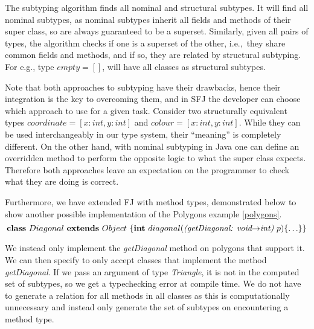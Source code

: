 \documentclass[runningheads]{llncs}
\begin{document}
The subtyping algorithm finds all nominal and structural subtypes.
It will find all nominal subtypes, as nominal subtypes inherit all fields and methods of their super class, so are always guaranteed to be a superset. 
Similarly, given all pairs of types, the algorithm checks if one is a superset of the other, i.e.,\ they share common fields and methods, and if so, they are related by structural subtyping. 
For e.g., type $empty = []$, will have all classes as structural subtypes. 

Note that both approaches to subtyping have their drawbacks, hence their integration is the key to overcoming them, and in SFJ the developer can choose which approach to use for a given task.
Consider two structurally equivalent types $coordinate = [x:int, y:int]$ and $colour = [x:int, y:int]$. 
While they can be used interchangeably in our type system, their ``meaning'' is completely different.
On the other hand, with nominal subtyping in Java one can define an overridden method to perform the opposite logic to what the super class expects. 
Therefore both approaches leave an expectation on the programmer to check what they are doing is correct. 

Furthermore, we have extended FJ with method types, demonstrated below to show another possible implementation of the Polygons example \autoref{polygons}.
$$
\mathbf{class} \  Diagonal \ \mathbf{extends }\  Object\ \{
	\mathbf{int}\ diagonal(\textit{(getDiagonal: void$\rightarrow$int)}  \ p)\{\ldots\}
\}
$$

We instead only implement the \emph{getDiagonal} method on polygons that support it. We can then specify to only accept classes that implement the method \emph{getDiagonal}. If we pass an argument of type \emph{Triangle}, it is not in the computed set of subtypes, so we get a typechecking error at compile time.
We do not have to generate a relation for all methods in all classes as this is computationally unnecessary and instead
only generate the set of subtypes on encountering a method type.

\end{document}
